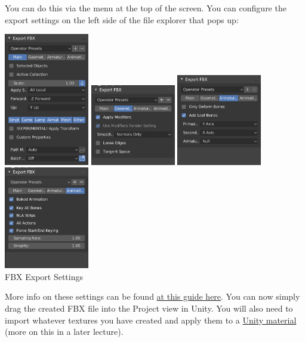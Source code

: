 \documentclass[11pt]{article}
\begin{document}
You can do this via the menu  at the top of the screen.  You can
configure the export settings on the left side of the file explorer that pops up:
\begin{center}
    \includegraphics[width=10em]{fbx-export-settings-1} 
    \includegraphics[width=10em]{fbx-export-settings-2} 
    \includegraphics[width=10em]{fbx-export-settings-3} 
    \includegraphics[width=10em]{fbx-export-settings-4}\\
    FBX Export Settings
\end{center}

\pagebreak
More info on these settings can be found 
\href{https://digitalrune.github.io/DigitalRune-Documentation/html/6f749972-9cb2-4274-b283-c327ba45e379.htm}{at this guide here}.
You can now simply drag the created FBX file into the Project view in Unity.  You will also need to
import whatever textures you have created and apply them to a 
\href{https://docs.unity3d.com/Manual/Materials.html}{Unity material} (more on this in a later lecture).
\end{document}
